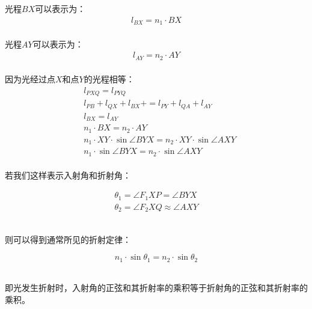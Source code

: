 \documentclass[UTF8]{ctexart}
\begin{document}
\newpage

    光程$BX$可以表示为：
    \begin{align}
        l_{BX}=n_1\cdot BX
    \end{align}\\
    光程$AY$可以表示为：
    \begin{align}
        l_{AY}=n_2\cdot AY
    \end{align}\\
    因为光经过点$X$和点$Y$的光程相等：
    \begin{align}
        &l_{PXQ}=l_{PYQ}\\[4mm]
        &l_{PB}+l_{QX}+l_{BX}+=l_{PY}+l_{QA}+l_{AY}\\[4mm]
        &l_{BX}=l_{AY}\\[4mm]
        &n_1\cdot BX=n_2\cdot AY\\[4mm]
        &n_1\cdot XY\cdot\sin{\angle BYX}=n_2\cdot XY\cdot\sin{\angle AXY}\\[4mm]
        &n_1\cdot\sin{\angle BYX}=n_2\cdot\sin{\angle AXY}
    \end{align}\\
    若我们这样表示入射角和折射角：
    \begin{large}
        \begin{align*}
            \theta_1=\angle F_1XP=\angle BYX\\[4mm]
            \theta_2=\angle F_2XQ\approx \angle AXY
        \end{align*}
    \end{large}\\
    则可以得到通常所见的折射定律：
    \begin{large}
        \begin{equation*}
            n_1\cdot\sin{\theta_1}=n_2\cdot\sin{\theta_2}
        \end{equation*}
    \end{large}\\
    即光发生折射时，入射角的正弦和其折射率的乘积等于折射角的正弦和其折射率的乘积。

\newpage
\end{document}
